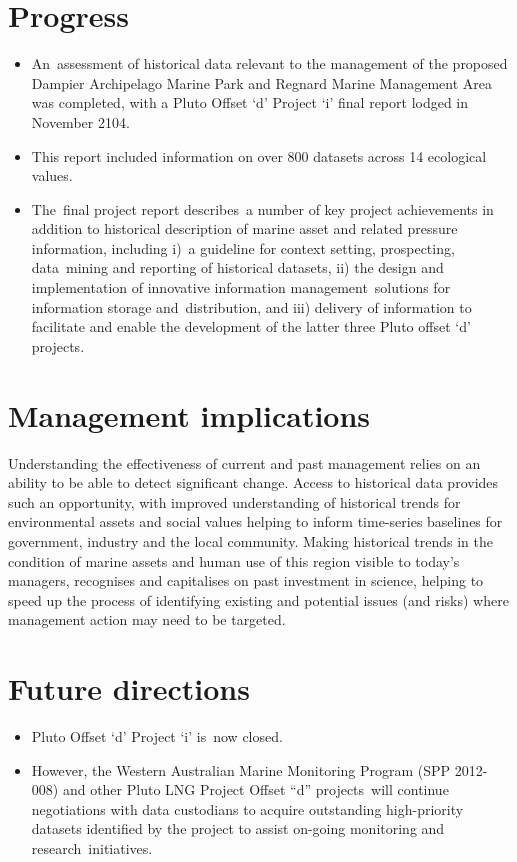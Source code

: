 \documentclass[version=last, paper=a4, DIV=18, usenames, dvipsnames]{scrartcl}
\begin{document}
\section*{Progress}
\begin{itemize}
\itemsep1pt\parskip0pt
\item
  An~assessment of historical data relevant to the management of the
  proposed Dampier Archipelago Marine Park and Regnard Marine Management
  Area was completed, with a Pluto Offset `d' Project `i' final report
  lodged in November 2104.
\item
  This report included information on over 800 datasets across 14
  ecological values.
\item
  The~final project report describes~a number of key project
  achievements in addition to historical description of marine asset and
  related pressure information, including i)~a guideline for context
  setting, prospecting, data~mining and reporting of historical
  datasets, ii) the design and implementation of innovative information
  management~solutions for information storage and~distribution, and
  iii) delivery of information to facilitate and enable the development
  of the latter three Pluto offset `d' projects.
\end{itemize}



\section*{Management implications}
Understanding the effectiveness of current and past management relies on
an ability to be able to detect significant change. Access to historical
data provides such an opportunity, with improved understanding of
historical trends for environmental assets and social values helping to
inform time-series baselines for government, industry and the local
community. Making historical trends in the condition of marine assets
and human use of this region visible to today's managers, recognises and
capitalises on past investment in science, helping to speed up the
process of identifying existing and potential issues (and risks) where
management action may need to be targeted.



\section*{Future directions}
\begin{itemize}
\itemsep1pt\parskip0pt
\item
  Pluto Offset `d' Project `i' is~now closed.
\item
  However, the Western Australian Marine Monitoring Program (SPP
  2012-008) and other Pluto LNG Project Offset ``d'' projects~will
  continue negotiations with data custodians to acquire outstanding
  high-priority datasets identified by the project to assist on-going
  monitoring and research~initiatives.
\end{itemize}




\clearpage
\end{document}
